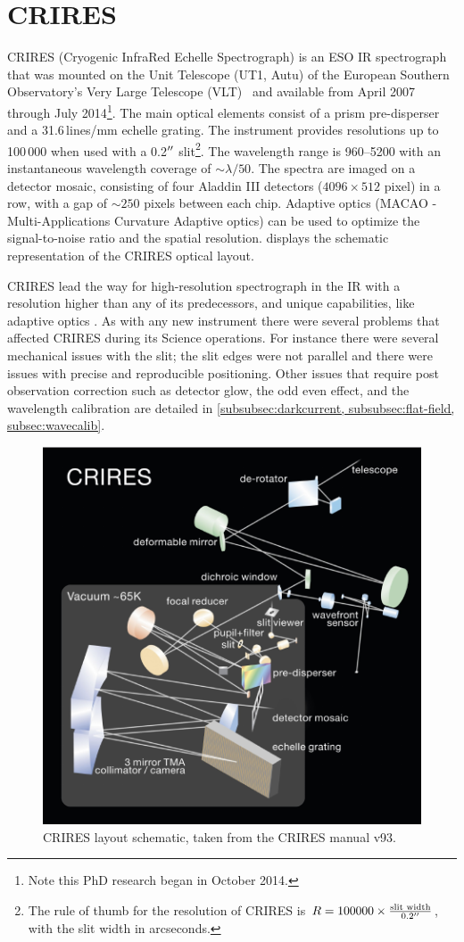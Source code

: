 \section{CRIRES}
\label{sec:CRIRES}
CRIRES (Cryogenic InfraRed Echelle Spectrograph) is an ESO {IR} spectrograph that was mounted on the Unit Telescope (UT1, Autu) of the European Southern Observatory's Very Large Telescope (VLT)~\citep{kaeufl_crires_2004} and available from April 2007 through July 2014\footnote{Note this PhD research began in October 2014.}.
The main optical elements consist of a prism pre-disperser and a 31.6\,lines/mm echelle grating.
The instrument provides resolutions up to 100\,000 when used with a 0.2$^{\prime\prime}$ slit\footnote{The rule of thumb for the resolution of CRIRES is \(R = 100000 \times \frac{\textrm{slit width}}{0.2^{\prime\prime}}\), with the slit width in arcseconds.}.
The wavelength range is 960--5200\nm{} with an instantaneous wavelength coverage of \(\sim \lambda/50\).
The spectra are imaged on a detector mosaic, consisting of four Aladdin III detectors (\(4096 \times 512\) pixel) in a row, with a gap of \(\sim 250\) pixels between each chip.
Adaptive optics (MACAO - Multi-Applications Curvature Adaptive optics) can be used to optimize the signal-to-noise ratio and the spatial resolution.
 displays the schematic representation of the CRIRES optical layout.

CRIRES lead the way for high-resolution spectrograph in the {IR} with a resolution higher than any of its predecessors, and unique capabilities, like adaptive optics .
As with any new instrument there were several problems that affected CRIRES during its Science operations.
For instance there were several mechanical issues with the slit; the slit edges were not parallel and there were issues with precise and reproducible positioning.
Other issues that require post observation correction such as detector glow, the odd even effect, and the wavelength calibration are detailed in \cref{subsubsec:darkcurrent, subsubsec:flat-field, subsec:wavecalib}.

\begin{figure}
    \centering
    \includegraphics[width=0.7\linewidth]{figures/spectroscopy/CRIRES_schematic.pdf}
    \caption{CRIRES layout schematic, taken from the CRIRES manual v93.}
    \label{fig:criresschematic}
\end{figure}


